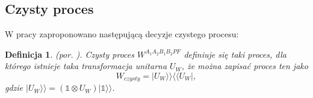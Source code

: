 \documentclass[10pt]{article} %
\newtheorem{definicja}{Definicja}
\newcommand{\Ket}[1]{|#1\rangle}
\newcommand{\Bra}[1]{\langle#1|}
\newcommand{\BBra}[1]{\langle\langle#1|}
\newcommand{\KKet}[1]{|#1\rangle\rangle}
\newcommand{\I}{\mathbb{1}}
\begin{document}
\subsection{Czysty proces}
W pracy \cite{purification} zaproponowano następującą decyzje czystego procesu:
\begin{definicja}
(por. \cite{purification}).
Czysty proces $W^{A_1A_2B_1B_2PF}$ definiuje się taki proces, dla którego istnieje taka transformacja unitarna $U_W$, że można zapisać proces ten jako
\begin{equation}
W_{czysty} = \KKet{U_W}\BBra{U_W},
\end{equation}
gdzie $\KKet{U_W} = (\I \otimes U_W)\KKet{\I}$.
\end{definicja}
\end{document}
